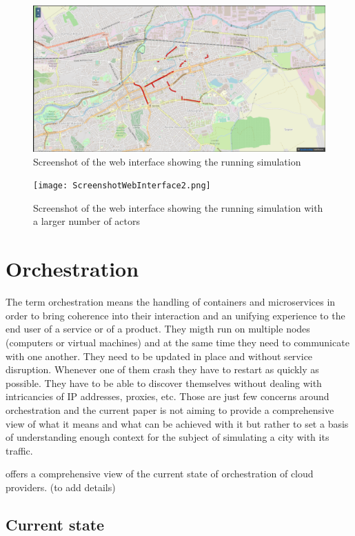 \documentclass[conference]{IEEEtran}
\begin{document}
\begin{figure}
  \includegraphics[width=0.9\linewidth]{ScreenshotWebInterface.png}
  \centering
  \caption{Screenshot of the web interface showing the running simulation}
  \label{fig:ScreenshotWebInterface}
\end{figure}

\begin{figure}
  \texttt{[image: ScreenshotWebInterface2.png]}
  \centering
  \caption{Screenshot of the web interface showing the running simulation with a larger number of actors}
  \label{fig:ScreenshotWebInterface2}
\end{figure}

\section{Orchestration}
\label{sec:orchestration}

The term orchestration means the handling of containers and microservices in order to bring coherence into their interaction and an unifying experience to the end user of a service or of a product. They migth run on multiple nodes (computers or virtual machines) and at the same time they need to communicate with one another. They need to be updated in place and without service disruption. Whenever one of them crash they have to restart as quickly as possible. They have to be able to discover themselves without dealing with intricancies of IP addresses, proxies, etc. Those are just few concerns around orchestration and the current paper is not aiming to provide a comprehensive view of what it means and what can be achieved with it but rather to set a basis of understanding enough context for the subject of simulating a city with its traffic.

\cite{7922500} offers a comprehensive view of the current state of orchestration of cloud providers. (to add details)

\subsection{Current state}
\end{document}
